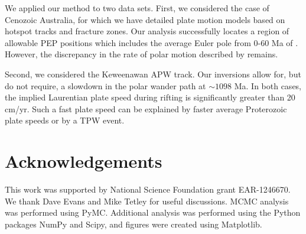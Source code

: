 \documentclass[preprint,12pt,authoryear]{elsarticle}
\begin{document}
We applied our method to two data sets. First, we considered the case of Cenozoic Australia,
for which we have detailed plate motion models based on hotspot tracks and fracture zones.
Our analysis successfully locates a region of allowable PEP positions which includes
the average Euler pole from 0-60 Ma of \citet{seton2012global}.
However, the discrepancy in the rate of polar motion described by \citet{idnurm1985lateII} remains.

Second, we considered the Keweenawan APW track.
Our inversions allow for, but do not require, a slowdown in the polar wander path at $\sim1098$ Ma.
In both cases, the implied Laurentian plate speed during rifting is significantly greater than 20 cm/yr.
Such a fast plate speed can be explained by faster average Proterozoic plate speeds or by a TPW event.

\section*{Acknowledgements}
\label{sec:acknowledgements}
This work was supported by National Science Foundation grant EAR-1246670. 
We thank Dave Evans and Mike Tetley for useful discussions.
MCMC analysis was performed using PyMC.
Additional analysis was performed using the Python packages NumPy and Scipy, and figures were created using Matplotlib.

\nocite{hunter2007matplotlib}
\nocite{van2011numpy}
\nocite{jones2001open}




 


\end{document}
